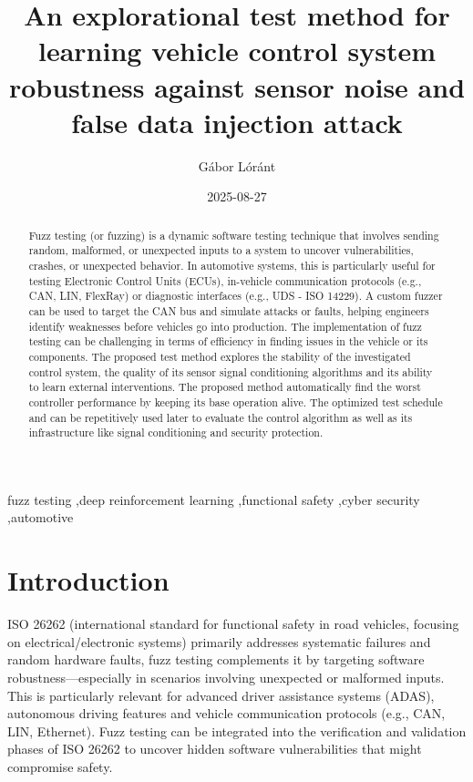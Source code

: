 \documentclass[a4paper, fleqn]{template/cas-dc}
\title[mode=title]{An explorational test method for learning vehicle control system robustness against sensor noise and false data injection attack}
\date{2025-08-27}
\author{Gábor Lóránt}
\begin{document}
	\begin{keywords}
		fuzz testing \sep deep reinforcement learning \sep functional safety \sep cyber security \sep automotive
	\end{keywords}
	
	
	\maketitle
	
	\begin{abstract}
		Fuzz testing (or fuzzing) is a dynamic software testing technique that involves sending random, malformed, or unexpected inputs to a system to uncover vulnerabilities, crashes, or unexpected behavior. In automotive systems, this is particularly useful for testing Electronic Control Units (ECUs), in-vehicle communication protocols (e.g., CAN, LIN, FlexRay) or diagnostic interfaces (e.g., UDS - ISO 14229). A custom fuzzer can be used to target the CAN bus and simulate attacks or faults, helping engineers identify weaknesses before vehicles go into production. The implementation of fuzz testing can be challenging in terms of efficiency in finding issues in the vehicle or its components. 
		The proposed test method explores the stability of the investigated control system, the quality of its sensor signal conditioning algorithms and its ability to learn external interventions. The proposed method automatically find the worst controller performance by keeping its base operation alive. The optimized test schedule and can be repetitively used later to evaluate the control algorithm as well as its infrastructure like signal conditioning and security protection.
	\end{abstract}
	
	\section{Introduction}
	
	ISO 26262 (international standard for functional safety in road vehicles, focusing on electrical/electronic systems) primarily addresses systematic failures and random hardware faults, fuzz testing complements it by targeting software robustness—especially in scenarios involving unexpected or malformed inputs. This is particularly relevant for advanced driver assistance systems (ADAS), autonomous driving features and vehicle communication protocols (e.g., CAN, LIN, Ethernet). Fuzz testing can be integrated into the verification and validation phases of ISO 26262 to uncover hidden software vulnerabilities that might compromise safety.
	
\end{document}
